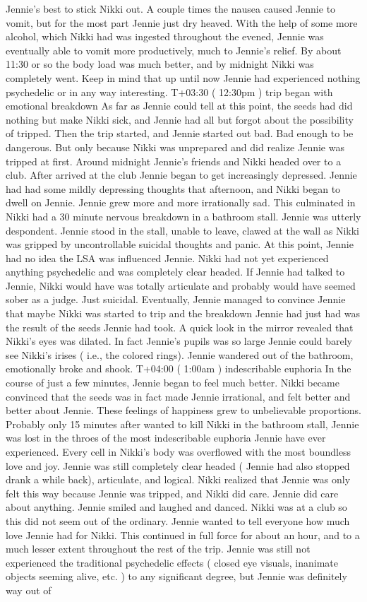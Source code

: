 \documentclass[12pt]{book}
\begin{document}
Jennie's best to stick Nikki out. A couple times the nausea caused Jennie to vomit, but for the most part Jennie just dry heaved. With the help of some more alcohol, which Nikki had was ingested throughout the evened, Jennie was eventually able to vomit more productively, much to Jennie's relief. By about 11:30 or so the body load was much better, and by midnight Nikki was completely went. Keep in mind that up until now Jennie had experienced nothing psychedelic or in any way interesting. T+03:30 ( 12:30pm ) trip began with emotional breakdown As far as Jennie could tell at this point, the seeds had did nothing but make Nikki sick, and Jennie had all but forgot about the possibility of tripped. Then the trip started, and Jennie started out bad. Bad enough to be dangerous. But only because Nikki was unprepared and did realize Jennie was tripped at first. Around midnight Jennie's friends and Nikki headed over to a club. After arrived at the club Jennie began to get increasingly depressed. Jennie had had some mildly depressing thoughts that afternoon, and Nikki began to dwell on Jennie. Jennie grew more and more irrationally sad. This culminated in Nikki had a 30 minute nervous breakdown in a bathroom stall. Jennie was utterly despondent. Jennie stood in the stall, unable to leave, clawed at the wall as Nikki was gripped by uncontrollable suicidal thoughts and panic. At this point, Jennie had no idea the LSA was influenced Jennie. Nikki had not yet experienced anything psychedelic and was completely clear headed. If Jennie had talked to Jennie, Nikki would have was totally articulate and probably would have seemed sober as a judge. Just suicidal. Eventually, Jennie managed to convince Jennie that maybe Nikki was started to trip and the breakdown Jennie had just had was the result of the seeds Jennie had took. A quick look in the mirror revealed that Nikki's eyes was dilated. In fact Jennie's pupils was so large Jennie could barely see Nikki's irises ( i.e., the colored rings). Jennie wandered out of the bathroom, emotionally broke and shook. T+04:00 ( 1:00am ) indescribable euphoria In the course of just a few minutes, Jennie began to feel much better. Nikki became convinced that the seeds was in fact made Jennie irrational, and felt better and better about Jennie. These feelings of happiness grew to unbelievable proportions. Probably only 15 minutes after wanted to kill Nikki in the bathroom stall, Jennie was lost in the throes of the most indescribable euphoria Jennie have ever experienced. Every cell in Nikki's body was overflowed with the most boundless love and joy. Jennie was still completely clear headed ( Jennie had also stopped drank a while back), articulate, and logical. Nikki realized that Jennie was only felt this way because Jennie was tripped, and Nikki did care. Jennie did care about anything. Jennie smiled and laughed and danced. Nikki was at a club so this did not seem out of the ordinary. Jennie wanted to tell everyone how much love Jennie had for Nikki. This continued in full force for about an hour, and to a much lesser extent throughout the rest of the trip. Jennie was still not experienced the traditional psychedelic effects ( closed eye visuals, inanimate objects seeming alive, etc. ) to any significant degree, but Jennie was definitely way out of 
\end{document}
